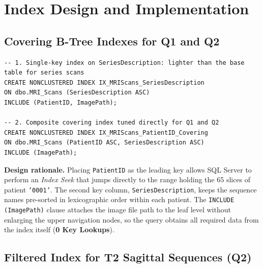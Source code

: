 \section{Index Design and Implementation}
\label{sec:index-engineering}

\subsection{Covering B-Tree Indexes for Q1 and Q2}

\begin{lstlisting}[caption={Two covering B-Tree indexes on \texttt{MRI\_Scans}}, label={lst:covering}]
-- 1. Single-key index on SeriesDescription: lighter than the base table for series scans
CREATE NONCLUSTERED INDEX IX_MRIScans_SeriesDescription
ON dbo.MRI_Scans (SeriesDescription ASC)
INCLUDE (PatientID, ImagePath);

-- 2. Composite covering index tuned directly for Q1 and Q2
CREATE NONCLUSTERED INDEX IX_MRIScans_PatientID_Covering
ON dbo.MRI_Scans (PatientID ASC, SeriesDescription ASC)
INCLUDE (ImagePath);
\end{lstlisting}

\textbf{Design rationale.} Placing \texttt{PatientID} as the leading key allows SQL Server to perform an \textit{Index Seek} that jumps directly to the range holding the 65 slices of patient \texttt{'0001'}. The second key column, \texttt{SeriesDescription}, keeps the sequence names pre-sorted in lexicographic order within each patient. The \texttt{INCLUDE (ImagePath)} clause attaches the image file path to the leaf level without enlarging the upper navigation nodes, so the query obtains all required data from the index itself (\textbf{0 Key Lookups}).

\subsection{Filtered Index for T2 Sagittal Sequences (Q2)}

